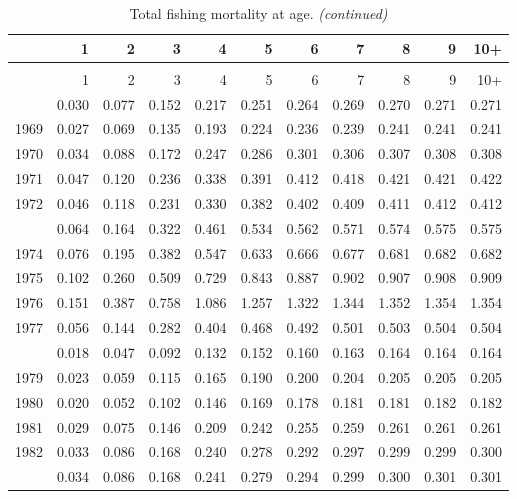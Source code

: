 \documentclass[
]{article}
\begin{document}
\begin{longtable}[t]{lrrrrrrrrrr}
\caption{\label{tab:FAA-tot-table}Total fishing mortality at age.}\\
\toprule
  & 1 & 2 & 3 & 4 & 5 & 6 & 7 & 8 & 9 & 10+\\
\midrule
\endfirsthead
\caption[]{Total fishing mortality at age. \textit{(continued)}}\\
\toprule
  & 1 & 2 & 3 & 4 & 5 & 6 & 7 & 8 & 9 & 10+\\
\midrule
\endhead

\endfoot
\bottomrule
\endlastfoot
1968 & 0.030 & 0.077 & 0.152 & 0.217 & 0.251 & 0.264 & 0.269 & 0.270 & 0.271 & 0.271\\
1969 & 0.027 & 0.069 & 0.135 & 0.193 & 0.224 & 0.236 & 0.239 & 0.241 & 0.241 & 0.241\\
1970 & 0.034 & 0.088 & 0.172 & 0.247 & 0.286 & 0.301 & 0.306 & 0.307 & 0.308 & 0.308\\
1971 & 0.047 & 0.120 & 0.236 & 0.338 & 0.391 & 0.412 & 0.418 & 0.421 & 0.421 & 0.422\\
1972 & 0.046 & 0.118 & 0.231 & 0.330 & 0.382 & 0.402 & 0.409 & 0.411 & 0.412 & 0.412\\
\addlinespace
1973 & 0.064 & 0.164 & 0.322 & 0.461 & 0.534 & 0.562 & 0.571 & 0.574 & 0.575 & 0.575\\
1974 & 0.076 & 0.195 & 0.382 & 0.547 & 0.633 & 0.666 & 0.677 & 0.681 & 0.682 & 0.682\\
1975 & 0.102 & 0.260 & 0.509 & 0.729 & 0.843 & 0.887 & 0.902 & 0.907 & 0.908 & 0.909\\
1976 & 0.151 & 0.387 & 0.758 & 1.086 & 1.257 & 1.322 & 1.344 & 1.352 & 1.354 & 1.354\\
1977 & 0.056 & 0.144 & 0.282 & 0.404 & 0.468 & 0.492 & 0.501 & 0.503 & 0.504 & 0.504\\
\addlinespace
1978 & 0.018 & 0.047 & 0.092 & 0.132 & 0.152 & 0.160 & 0.163 & 0.164 & 0.164 & 0.164\\
1979 & 0.023 & 0.059 & 0.115 & 0.165 & 0.190 & 0.200 & 0.204 & 0.205 & 0.205 & 0.205\\
1980 & 0.020 & 0.052 & 0.102 & 0.146 & 0.169 & 0.178 & 0.181 & 0.181 & 0.182 & 0.182\\
1981 & 0.029 & 0.075 & 0.146 & 0.209 & 0.242 & 0.255 & 0.259 & 0.261 & 0.261 & 0.261\\
1982 & 0.033 & 0.086 & 0.168 & 0.240 & 0.278 & 0.292 & 0.297 & 0.299 & 0.299 & 0.300\\
\addlinespace
1983 & 0.034 & 0.086 & 0.168 & 0.241 & 0.279 & 0.294 & 0.299 & 0.300 & 0.301 & 0.301\\

\end{longtable}
\end{document}
